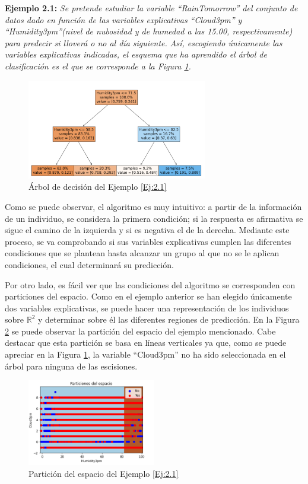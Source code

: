 \documentclass[12pt,twoside]{article}
\begin{document}
\textbf{Ejemplo 2.1: } \label{Ej:2.1} \emph{Se pretende estudiar la variable ``RainTomorrow'' del conjunto de datos dado en función de las variables explicativas ``Cloud3pm'' y ``Humidity3pm''(nivel de nubosidad y de humedad a las 15.00, respectivamente) para predecir si lloverá o no al día siguiente. Así, escogiendo únicamente las variables explicativas indicadas, el esquema que ha aprendido el árbol de clasificación es el que se corresponde a la Figura \ref{fig:Ejemplo 2.1}. }
\begin{figure}[h]
	\centering
	\includegraphics[width = 0.7\textwidth]{ex2_1_01}
	\caption{Árbol de decisión del Ejemplo \ref{Ej:2.1}}
	\label{fig:Ejemplo 2.1}
\end{figure}

Como se puede observar, el algoritmo es muy intuitivo: a  partir de la información de un individuo, se considera la primera condición; si la respuesta es afirmativa se sigue el camino de la izquierda y si es negativa el de la derecha. Mediante este proceso, se va comprobando si sus variables explicativas cumplen las diferentes condiciones que se plantean hasta alcanzar un grupo al que no se le aplican condiciones, el cual determinará su predicción.

Por otro lado, es fácil ver que las condiciones del algoritmo se corresponden con particiones del espacio. Como en el ejemplo anterior se han elegido únicamente dos variables explicativas, se puede hacer una representación de los individuos sobre $\mathbb{R}^{2}$ y determinar sobre él las diferentes regiones de predicción. En la Figura \ref{fig:Ejemplo 2.1.2} se puede observar la partición del espacio del ejemplo mencionado. Cabe destacar que esta partición se basa en líneas verticales ya que, como se puede apreciar en la Figura \ref{fig:Ejemplo 2.1}, la variable ``Cloud3pm'' no ha sido seleccionada en el árbol para ninguna de las escisiones.
\begin{figure}[h]
	\centering
	\includegraphics[width = 0.5\textwidth]{ex2_1_02}
	\caption{Partición del espacio del Ejemplo \ref{Ej:2.1}}
	\label{fig:Ejemplo 2.1.2}
\end{figure}
\end{document}
